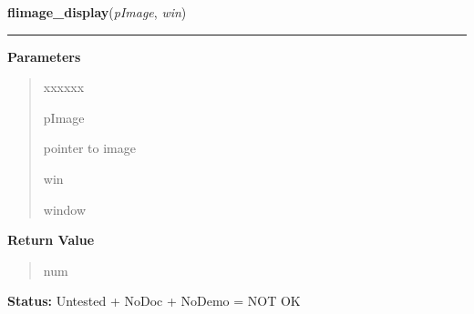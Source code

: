 \hspace{.8\funcindent}\begin{boxedminipage}{\funcwidth}

    \raggedright \textbf{flimage\_display}(\textit{pImage}, \textit{win})

    \vspace{-1.5ex}

    \rule{\textwidth}{0.5\fboxrule}
\setlength{\parskip}{2ex}
\setlength{\parskip}{1ex}
      \textbf{Parameters}
      \vspace{-1ex}

      \begin{quote}
        \begin{Ventry}{xxxxxx}

          \item[pImage]

          pointer to image

          \item[win]

          window

        \end{Ventry}

      \end{quote}

      \textbf{Return Value}
    \vspace{-1ex}

      \begin{quote}
      num

      \end{quote}

\textbf{Status:} Untested + NoDoc + NoDemo = NOT OK



    \end{boxedminipage}

    \label{xformslib:flflimage:flimage_sdisplay}

    \vspace{0.5ex}


